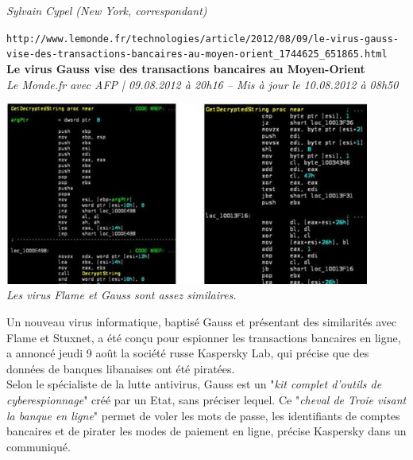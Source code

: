\documentclass[11pt,twoside,a4paper]{article}
\begin{document}
\emph{\small Sylvain Cypel (New York, correspondant)} %

\clearpage

\texttt{http://www.lemonde.fr/technologies/article/2012/08/09/le-virus-gauss-vise-des-transactions-bancaires-au-moyen-orient\_1744625\_651865.html}~\\

\textbf{\LARGE Le virus Gauss vise des transactions bancaires au Moyen-Orient}~\\

\emph{\small Le Monde.fr avec AFP | 09.08.2012 {\`a} 20h16 -- Mis {\`a} jour le 10.08.2012 {\`a} 08h50}~\\

\begin{minipage}[ht]{12.25cm}
	\includegraphics[width=12.00cm]{img/1744629_3_8bd2_les-virus-flame-et-gauss-sont-assez-similaires_6da5f9190191e99b3ac718154775b7f0.jpg}
	~\\ \emph{\centering Les virus Flame et Gauss sont assez similaires. }
\end{minipage} \hfill \begin{minipage}[ht]{6.50cm}
	\small 
	Un nouveau virus informatique, baptis{\'e} Gauss et pr{\'e}sentant des similarit{\'e}s avec Flame et Stuxnet, a {\'e}t{\'e} con\c{c}u pour espionner les transactions bancaires en ligne, a annonc{\'e} jeudi 9 ao{\^u}t la soci{\'e}t{\'e} russe Kaspersky Lab, qui pr{\'e}cise que des donn{\'e}es de banques libanaises ont {\'e}t{\'e} pirat{\'e}es.~\\
	
	Selon le sp{\'e}cialiste de la lutte antivirus, Gauss est un "\emph{kit complet d'outils de cyberespionnage}" cr{\'e}{\'e} par un Etat, sans pr{\'e}ciser lequel. Ce "\emph{cheval de Troie visant la banque en ligne}" permet de voler les mots de passe, les identifiants de comptes bancaires et de pirater les modes de paiement en ligne, pr{\'e}cise Kaspersky dans un communiqu{\'e}.~\\
\end{minipage}
\end{document}
